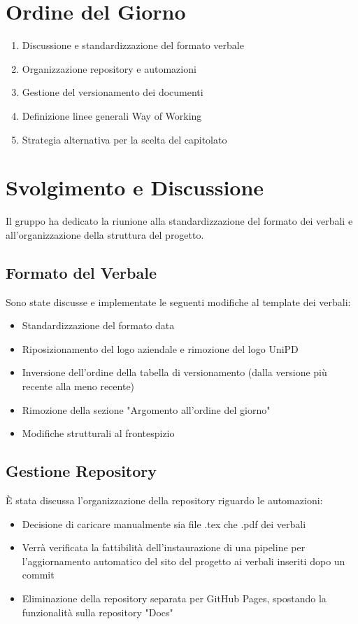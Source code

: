 \documentclass[a4paper,12pt]{article}
\begin{document}
\section{Ordine del Giorno}
\begin{enumerate}
    \item Discussione e standardizzazione del formato verbale
    \item Organizzazione repository e automazioni
    \item Gestione del versionamento dei documenti
    \item Definizione linee generali Way of Working
    \item Strategia alternativa per la scelta del capitolato
\end{enumerate}
\vspace{0.5cm}
\section{Svolgimento e Discussione}
Il gruppo ha dedicato la riunione alla standardizzazione del formato dei verbali e all'organizzazione della struttura del progetto. 

\subsection{Formato del Verbale}
Sono state discusse e implementate le seguenti modifiche al template dei verbali:
\begin{itemize}
    \item Standardizzazione del formato data
    \item Riposizionamento del logo aziendale e rimozione del logo UniPD
    \item Inversione dell'ordine della tabella di versionamento (dalla versione più recente alla meno recente)
    \item Rimozione della sezione "Argomento all'ordine del giorno"
    \item Modifiche strutturali al frontespizio
\end{itemize}

\subsection{Gestione Repository}
È stata discussa l'organizzazione della repository riguardo le automazioni:
\begin{itemize}
    \item Decisione di caricare manualmente sia file .tex che .pdf dei verbali
    \item Verrà verificata la fattibilità dell'instaurazione di una pipeline per l'aggiornamento automatico del sito del progetto ai verbali inseriti dopo un commit
    \item Eliminazione della repository separata per GitHub Pages, spostando la funzionalità sulla repository "Docs"
\end{itemize}
\end{document}
